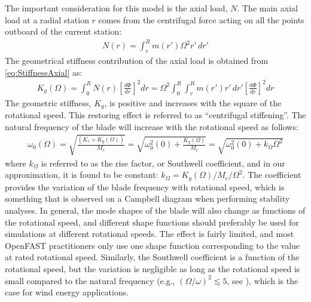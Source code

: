 \documentclass[wes, manuscript]{copernicus}
\begin{document}
The important consideration for this model is the axial load, $N$.
The main axial load at a radial station $r$ comes from the centrifugal force acting on all the points outboard of the current station:
\begin{align}
    N(r)=\int_r^R m(r') \Omega^2  r' \, dr'
\end{align}
The geometrical stiffness contribution of the axial load is obtained from \autoref{eq:StiffnessAxial} as:
\begin{align}
    K_g(\Omega) = \int_0^R N(r) \left[\frac{d\Phi}{dr} \right]^2  dr  
    = \Omega^2 \int_0^R \int_r^R m(r') r' \, dr'
 \left[\frac{d\Phi}{dr} \right]^2 dr  
 \label{eq:GeomStiffCentri}
\end{align}
% 
The geometric stiffness, $K_g$, is positive and increases with the square of the rotational speed. 
This restoring effect is referred to as ``centrifugal stiffening''.
The natural frequency of the blade will increase with the rotational speed as follows:
\begin{align}
   \omega_0(\Omega)=\sqrt{\frac{(K_{e}+ K_g(\Omega))}{M_e}} 
   = \sqrt{ \omega_0^2(0) + \frac{K_g(\Omega)}{M_e} } 
   = \sqrt{ \omega_0^2(0) +  k_\Omega \Omega^2 } 
\end{align}
where $k_\Omega$ is referred to as the rise factor, or Southwell coefficient, and in our approximation, it is found to be constant: $k_\Omega=K_g(\Omega)/M_e/\Omega^2$.
The coefficient provides the variation of the blade frequency with rotational speed, which is something that is observed on a Campbell diagram when performing stability analyses.
In general, the mode shapes of the blade will also change as functions of the rotational speed, and different shape functions should preferably be used for simulations at different rotational speeds.
The effect is fairly limited, and most OpenFAST practitioners only use one shape function corresponding to the value at rated rotational speed.
Similarly, the Southwell coefficient is a function of the rotational speed, but the variation is negligible as long as the rotational speed is small compared to the natural frequency (e.g., $(\Omega/\omega)^2 \lesssim 5$, see \cite{bielawa:2006:book}), which is the case for wind energy applications.
\end{document}
